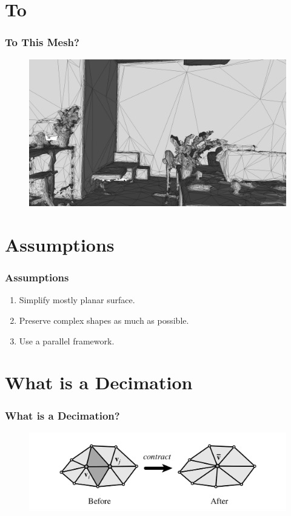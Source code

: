 \documentclass[
	10pt,
	t		%
]{beamer}
\begin{document}
\section{To}
\begin{frame}
\frametitle{To This Mesh?}
\begin{figure}[ht]
	\centering
    \includegraphics[width=1\textwidth]{to}
\end{figure}
\end{frame}

\section{Assumptions}
\begin{frame}
\frametitle{Assumptions}
\begin{enumerate}
\centering
\item Simplify mostly planar surface.
\item Preserve complex shapes as much as possible.
\item Use a parallel framework.
\end{enumerate}
\end{frame}

\section{What is a Decimation}
\begin{frame}
\frametitle{What is a Decimation?}
\begin{figure}[ht]
\centering
\includegraphics[width=1\textwidth]{edge_contraction}
\end{figure}
\end{frame}
\end{document}
